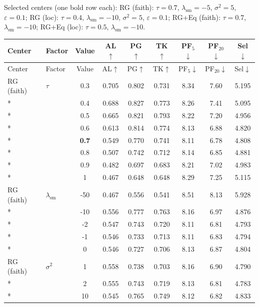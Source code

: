 \noindent Selected centers (one bold row each): RG (faith): $\tau{=}0.7$, $\lambda_{\mathrm{sm}}{=}{-}5$, $\sigma^2{=}5$, $\varepsilon{=}0.1$; RG (loc): $\tau{=}0.4$, $\lambda_{\mathrm{sm}}{=}{-}10$, $\sigma^2{=}5$, $\varepsilon{=}0.1$; RG+Eq (faith): $\tau{=}0.7$, $\lambda_{\mathrm{sm}}{=}{-}10$; RG+Eq (loc): $\tau{=}0.5$, $\lambda_{\mathrm{sm}}{=}{-}10$.\par
\begin{longtable}{@{}l l c c c c c c c@{}}
\toprule
Center & Factor & Value & AL$\uparrow$ & PG$\uparrow$ & TK$\uparrow$ & PF$_5$$\downarrow$ & PF$_{20}$$\downarrow$ & Sel$\downarrow$ \\
\midrule
\endfirsthead
\toprule
Center & Factor & Value & AL$\uparrow$ & PG$\uparrow$ & TK$\uparrow$ & PF$_5$$\downarrow$ & PF$_{20}$$\downarrow$ & Sel$\downarrow$ \\
\midrule
\endhead
\bottomrule
\endlastfoot
RG (faith) & $\tau$ & 0.3 & 0.705 & 0.802 & 0.731 & 8.34 & 7.60 & 5.195 \\*
 &  & 0.4 & 0.688 & 0.827 & 0.773 & 8.26 & 7.41 & 5.095 \\*
 &  & 0.5 & 0.665 & 0.821 & 0.793 & 8.22 & 7.20 & 4.956 \\*
 &  & 0.6 & 0.613 & 0.814 & 0.774 & 8.13 & 6.88 & 4.820 \\*
 &  & \textbf{0.7} & 0.549 & 0.770 & 0.741 & 8.11 & 6.78 & 4.808 \\*
 &  & 0.8 & 0.507 & 0.742 & 0.712 & 8.14 & 6.85 & 4.881 \\*
 &  & 0.9 & 0.482 & 0.697 & 0.683 & 8.21 & 7.02 & 4.983 \\*
 &  & 1 & 0.467 & 0.648 & 0.648 & 8.29 & 7.25 & 5.115 \\
\midrule
RG (faith) & $\lambda_{\mathrm{sm}}$ & {-}50 & 0.467 & 0.556 & 0.541 & 8.51 & 8.13 & 5.928 \\*
 &  & {-}10 & 0.556 & 0.777 & 0.763 & 8.16 & 6.97 & 4.876 \\*
 &  & {-}2 & 0.547 & 0.743 & 0.720 & 8.11 & 6.81 & 4.793 \\*
 &  & {-}1 & 0.546 & 0.733 & 0.713 & 8.11 & 6.83 & 4.794 \\*
 &  & 0 & 0.546 & 0.727 & 0.706 & 8.13 & 6.87 & 4.804 \\
\midrule
RG (faith) & $\sigma^2$ & 1 & 0.558 & 0.738 & 0.703 & 8.16 & 6.90 & 4.790 \\*
 &  & 2 & 0.555 & 0.743 & 0.719 & 8.13 & 6.81 & 4.783 \\*
 &  & 10 & 0.545 & 0.765 & 0.749 & 8.12 & 6.82 & 4.833 \\

\end{longtable}
